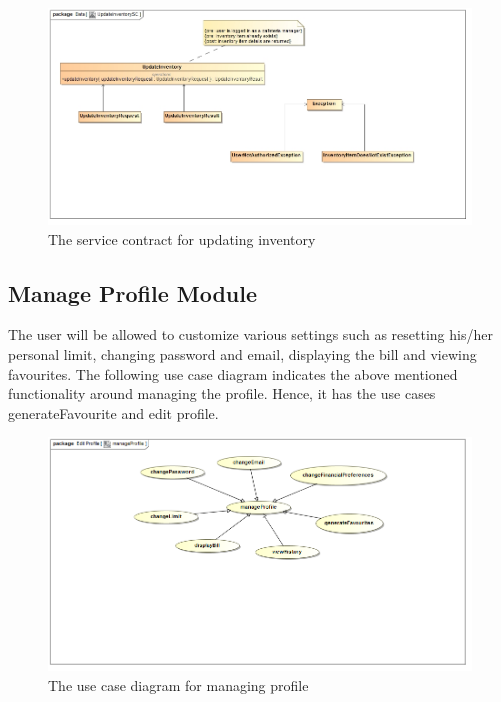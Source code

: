 \documentclass[a4paper,12pt]{report}
\begin{document}
\begin{figure}[H]
	\centering
	\includegraphics[width=1.0\textwidth]{../images/UpdateInventorySC.jpg}
	\caption{The service contract for updating inventory}
\end{figure}

\subsection{Manage Profile Module}
 The user will be allowed to customize various settings such as resetting his/her personal limit, changing password and email, displaying the bill and viewing favourites. The following use case diagram indicates the above mentioned functionality around managing the profile. Hence, it has the use cases generateFavourite and edit profile.

\begin{figure}[H]
  \centering
    \includegraphics[width=1.0\textwidth]{../Diagrams/ManageProfile/manageProfileUseCase.png}
    \caption{The use case diagram for managing profile} 
\end{figure}
\end{document}
